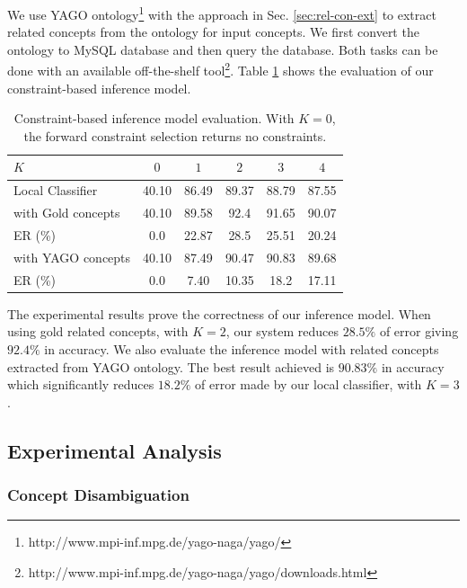 We use YAGO
ontology\footnote{http://www.mpi-inf.mpg.de/yago-naga/yago/} with the
approach in Sec. \ref{sec:rel-con-ext} to extract related concepts
from the ontology for input concepts. We first convert the ontology to
MySQL database and then query the database. Both tasks can be done
with an available off-the-shelf
tool\footnote{http://www.mpi-inf.mpg.de/yago-naga/yago/downloads.html}.
Table \ref{tab:inference} shows the evaluation of our constraint-based
inference model.

\begin{table}[hp]
\begin{center}
\begin{tabular}{|l|c|c|c|c|c|}
  \hline
  $K$      &  $0$      &      $1$  &      $2$  &      $3$  &      $4$  \\
  \hline
  \hline
  Local Classifier &  40.10  &  86.49  &  89.37  &  88.79  &  87.55  \\
  \hline
  with Gold concepts    &  40.10      &  89.58  &   92.4  &  91.65  &  90.07  \\
  ER (\%)  &  0.0      &  22.87  &   28.5  &  25.51  &  20.24  \\
  \hline
  with YAGO concepts    &  40.10      &  87.49  &  90.47  &  90.83  &  89.68  \\
  ER (\%)  &  0.0      &   7.40  &  10.35  &   18.2  &  17.11  \\
  \hline
\end{tabular}
\caption{Constraint-based inference model evaluation. With $K=0$, the
  forward constraint selection returns no constraints.}
\label{tab:inference}
\end{center}
\end{table}

The experimental results prove the correctness of our inference model.
When using gold related concepts, with $K=2$, our system reduces
$28.5\%$ of error giving $92.4\%$ in accuracy. We also evaluate the
inference model with related concepts extracted from YAGO
ontology. The best result achieved is $90.83\%$ in accuracy which
significantly reduces $18.2\%$ of error made by our local classifier,
with $K=3$.

\subsection{Experimental Analysis}

\subsubsection{Concept Disambiguation}

